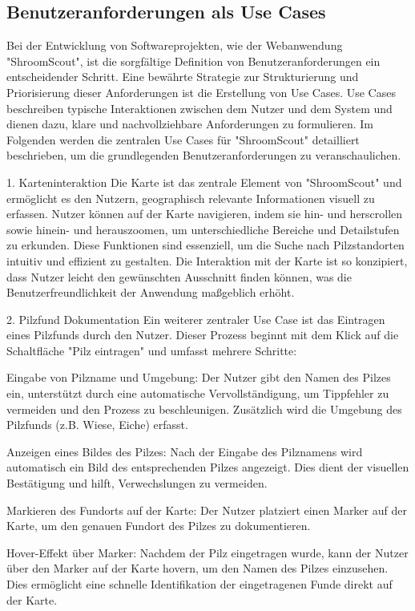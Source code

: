 \documentclass[../main.tex]{subfiles}
\begin{document}
\subsection{Benutzeranforderungen als Use Cases} %
Bei der Entwicklung von Softwareprojekten, wie der Webanwendung "ShroomScout", ist die sorgfältige Definition von 
Benutzeranforderungen ein entscheidender Schritt. Eine bewährte Strategie zur Strukturierung und Priorisierung dieser 
Anforderungen ist die Erstellung von Use Cases. Use Cases beschreiben typische Interaktionen zwischen dem Nutzer und 
dem System und dienen dazu, klare und nachvollziehbare Anforderungen zu formulieren. Im Folgenden werden die zentralen 
Use Cases für "ShroomScout" detailliert beschrieben, um die grundlegenden Benutzeranforderungen zu veranschaulichen.

1. Karteninteraktion
Die Karte ist das zentrale Element von "ShroomScout" und ermöglicht es den Nutzern, geographisch relevante Informationen 
visuell zu erfassen. Nutzer können auf der Karte navigieren, indem sie hin- und herscrollen sowie hinein- und herauszoomen, 
um unterschiedliche Bereiche und Detailstufen zu erkunden. Diese Funktionen sind essenziell, um die Suche nach Pilzstandorten 
intuitiv und effizient zu gestalten. Die Interaktion mit der Karte ist so konzipiert, dass Nutzer leicht den gewünschten 
Ausschnitt finden können, was die Benutzerfreundlichkeit der Anwendung maßgeblich erhöht.

2. Pilzfund Dokumentation
Ein weiterer zentraler Use Case ist das Eintragen eines Pilzfunds durch den Nutzer. Dieser Prozess beginnt mit dem Klick 
auf die Schaltfläche "Pilz eintragen" und umfasst mehrere Schritte:

Eingabe von Pilzname und Umgebung: 
Der Nutzer gibt den Namen des Pilzes ein, unterstützt durch eine automatische Vervollständigung, um Tippfehler zu vermeiden 
und den Prozess zu beschleunigen. Zusätzlich wird die Umgebung des Pilzfunds (z.B. Wiese, Eiche) erfasst.

Anzeigen eines Bildes des Pilzes: Nach der Eingabe des Pilznamens wird automatisch ein Bild des entsprechenden Pilzes angezeigt. 
Dies dient der visuellen Bestätigung und hilft, Verwechslungen zu vermeiden.

Markieren des Fundorts auf der Karte: Der Nutzer platziert einen Marker auf der Karte, um den genauen Fundort des Pilzes zu 
dokumentieren.

Hover-Effekt über Marker: Nachdem der Pilz eingetragen wurde, kann der Nutzer über den Marker auf der Karte hovern, um den 
Namen des Pilzes einzusehen. Dies ermöglicht eine schnelle Identifikation der eingetragenen Funde direkt auf der Karte.
\end{document}
